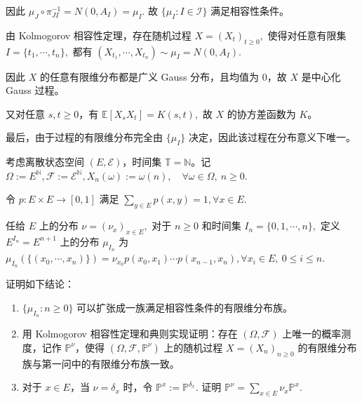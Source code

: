 \documentclass{ctexart}
\begin{document}
\begin{solution}
\begin{enumerate}
      因此
      \( \mu_J \circ \pi_{JI}^{-1} = N(0,A_I) = \mu_I. \)
      故 \(\{\mu_I : I \in \mathcal{I}\}\) 满足相容性条件。

      由 Kolmogorov 相容性定理，存在随机过程
      \( X = (X_t)_{t \geq 0}, \)
      使得对任意有限集
      \( I = \{t_1,\cdots,t_n\}, \)
      都有
      \( (X_{t_1},\cdots,X_{t_n}) \sim \mu_I = N(0,A_I). \)

      因此 \(X\) 的任意有限维分布都是广义 Gauss 分布，且均值为 \(0\)，故 \(X\) 是中心化 Gauss 过程。

      又对任意 \(s,t \geq 0\)，有
      \( \mathbb{E}[X_sX_t] = K(s,t), \)
      故 \(X\) 的协方差函数为 \(K\)。

      最后，由于过程的有限维分布完全由 \(\{\mu_I\}\) 决定，因此该过程在分布意义下唯一。
  \end{enumerate}
\end{solution}
\begin{problem}
  考虑离散状态空间 \((E,\mathcal{E})\)，时间集 \(\mathbb{T} = \mathbb{N}\)。记
  \( \Omega := E^{\mathbb{N}}, \mathcal{F} := \mathcal{E}^{\mathbb{N}}, X_n(\omega) := \omega(n), \quad \forall \omega \in \Omega,\ n \geq 0. \)

  令
  \( p : E \times E \to [0,1] \)
  满足
  \( \sum_{y \in E} p(x,y) = 1, \forall x \in E. \)

  任给 \(E\) 上的分布
  \( \nu = (\nu_x)_{x \in E}, \)
  对于 \(n \geq 0\) 和时间集
  \( I_n = \{0,1,\cdots,n\}, \)
  定义 \(E^{I_n} = E^{n+1}\) 上的分布 \(\mu_{I_n}\) 为
  \( \mu_{I_n}(\{(x_0,\cdots,x_n)\}) = \nu_{x_0}p(x_0,x_1)\cdots p(x_{n-1},x_n), \forall x_i \in E,\ 0 \leq i \leq n. \)

  证明如下结论：
  \begin{enumerate}
    \item \(\{\mu_{I_n} : n \geq 0\}\) 可以扩张成一族满足相容性条件的有限维分布族。
    \item 用 Kolmogorov 相容性定理和典则实现证明：存在 \((\Omega,\mathcal{F})\) 上唯一的概率测度，记作 \(\mathbb{P}^{\nu}\)，使得 \((\Omega,\mathcal{F},\mathbb{P}^{\nu})\) 上的随机过程
      \( X = (X_n)_{n \geq 0} \)
      的有限维分布族与第一问中的有限维分布族一致。
    \item 对于 \(x \in E\)，当 \(\nu = \delta_x\) 时，令
      \( \mathbb{P}^x := \mathbb{P}^{\delta_x}. \)
      证明
      \( \mathbb{P}^{\nu} = \sum_{x \in E} \nu_x \mathbb{P}^x. \)
  \end{enumerate}
\end{problem}
\end{document}
